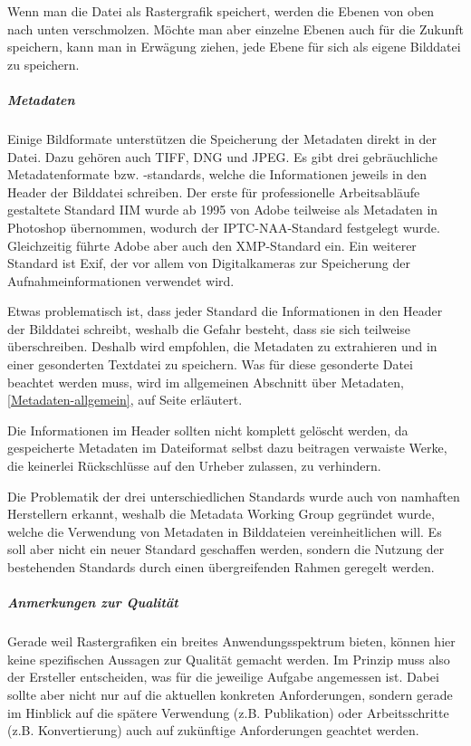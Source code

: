 Wenn man die Datei als Rastergrafik speichert, werden die Ebenen von oben nach unten verschmolzen. Möchte man aber einzelne Ebenen auch für die Zukunft speichern, kann man in Erwägung ziehen, jede Ebene für sich als eigene Bilddatei zu speichern.

\subparagraph{Metadaten}

Einige Bildformate unterstützen die Speicherung der Metadaten direkt in der Datei. Dazu gehören auch TIFF, DNG und JPEG. Es gibt drei gebräuchliche Metadatenformate bzw. -standards, welche die Informationen jeweils in den Header der Bilddatei schreiben. Der erste für professionelle Arbeitsabläufe gestaltete Standard IIM wurde ab 1995 von Adobe teilweise als Metadaten in Photoshop übernommen, wodurch der IPTC-NAA-Standard festgelegt wurde. Gleichzeitig führte Adobe aber auch den XMP-Standard ein. Ein weiterer Standard ist Exif, der vor allem von Digitalkameras zur Speicherung der Aufnahmeinformationen verwendet wird.

Etwas problematisch ist, dass jeder Standard die Informationen in den Header der Bilddatei schreibt, weshalb die Gefahr besteht, dass sie sich teilweise überschreiben. Deshalb wird empfohlen, die Metadaten zu extrahieren und in einer gesonderten Textdatei zu speichern. Was für diese gesonderte Datei beachtet werden muss, wird im allgemeinen Abschnitt über Metadaten, \ref{Metadaten-allgemein}, auf Seite \pageref{Metadaten-allgemein} erläutert.

Die Informationen im Header sollten nicht komplett gelöscht werden, da gespeicherte Metadaten im Dateiformat selbst dazu beitragen verwaiste Werke, die keinerlei Rückschlüsse auf den Urheber zulassen, zu verhindern.

Die Problematik der drei unterschiedlichen Standards wurde auch von namhaften Herstellern erkannt, weshalb die Metadata Working Group gegründet wurde, welche die Verwendung von Metadaten in Bilddateien vereinheitlichen will. Es soll aber nicht ein neuer Standard geschaffen werden, sondern die Nutzung der bestehenden Standards durch einen übergreifenden Rahmen geregelt werden.


\subparagraph{Anmerkungen zur Qualität}
Gerade weil Rastergrafiken ein breites Anwendungsspektrum bieten, können hier keine spezifischen Aussagen zur Qualität gemacht werden. Im Prinzip muss also der Ersteller entscheiden, was für die jeweilige Aufgabe angemessen ist. Dabei sollte aber nicht nur auf die aktuellen konkreten Anforderungen, sondern gerade im Hinblick auf die spätere Verwendung (z.B. Publikation) oder Arbeitsschritte (z.B. Konvertierung) auch auf zukünftige Anforderungen geachtet werden.


